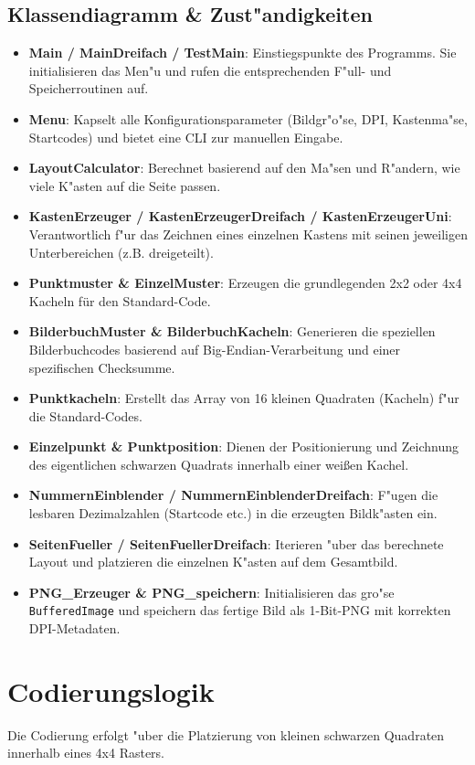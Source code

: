 \documentclass[a4paper,12pt]{article}
\begin{document}
\subsection{Klassendiagramm \& Zust"andigkeiten}
\begin{itemize}
    \item \textbf{Main / MainDreifach / TestMain}: Einstiegspunkte des Programms. Sie initialisieren das Men"u und rufen die entsprechenden F"ull- und Speicherroutinen auf.
    \item \textbf{Menu}: Kapselt alle Konfigurationsparameter (Bildgr"o"se, DPI, Kastenma"se, Startcodes) und bietet eine CLI zur manuellen Eingabe.
    \item \textbf{LayoutCalculator}: Berechnet basierend auf den Ma"sen und R"andern, wie viele K"asten auf die Seite passen.
    \item \textbf{KastenErzeuger / KastenErzeugerDreifach / KastenErzeugerUni}: Verantwortlich f"ur das Zeichnen eines einzelnen Kastens mit seinen jeweiligen Unterbereichen (z.B. dreigeteilt).
    \item \textbf{Punktmuster \& EinzelMuster}: Erzeugen die grundlegenden 2x2 oder 4x4 Kacheln für den Standard-Code.
    \item \textbf{BilderbuchMuster \& BilderbuchKacheln}: Generieren die speziellen Bilderbuchcodes basierend auf Big-Endian-Verarbeitung und einer spezifischen Checksumme.
    \item \textbf{Punktkacheln}: Erstellt das Array von 16 kleinen Quadraten (Kacheln) f"ur die Standard-Codes.
    \item \textbf{Einzelpunkt \& Punktposition}: Dienen der Positionierung und Zeichnung des eigentlichen schwarzen Quadrats innerhalb einer weißen Kachel.
    \item \textbf{NummernEinblender / NummernEinblenderDreifach}: F"ugen die lesbaren Dezimalzahlen (Startcode etc.) in die erzeugten Bildk"asten ein.
    \item \textbf{SeitenFueller / SeitenFuellerDreifach}: Iterieren "uber das berechnete Layout und platzieren die einzelnen K"asten auf dem Gesamtbild.
    \item \textbf{PNG\_Erzeuger \& PNG\_speichern}: Initialisieren das gro"se \texttt{BufferedImage} und speichern das fertige Bild als 1-Bit-PNG mit korrekten DPI-Metadaten.
\end{itemize}

\section{Codierungslogik}
Die Codierung erfolgt "uber die Platzierung von kleinen schwarzen Quadraten innerhalb eines 4x4 Rasters.
\end{document}
